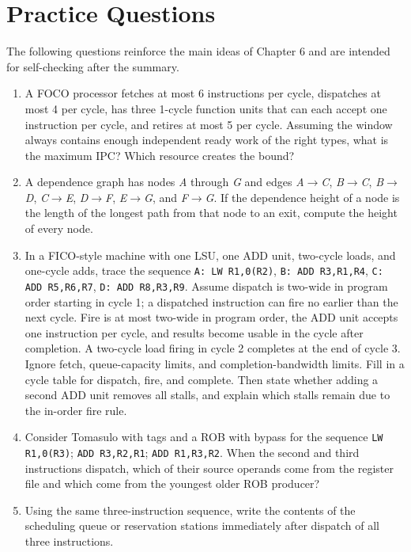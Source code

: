 \section{Practice Questions}\label{sec:ch6-practice}
The following questions reinforce the main ideas of Chapter 6 and are intended for self-checking after the summary.
\begin{enumerate}
    \item A FOCO processor fetches at most 6 instructions per cycle, dispatches at most 4 per cycle, has three 1-cycle function units that can each accept one instruction per cycle, and retires at most 5 per cycle.
    Assuming the window always contains enough independent ready work of the right types, what is the maximum IPC? Which resource creates the bound?
    \item A dependence graph has nodes \textit{A} through \textit{G} and edges \textit{A}$\rightarrow$\textit{C}, \textit{B}$\rightarrow$\textit{C}, \textit{B}$\rightarrow$\textit{D}, \textit{C}$\rightarrow$\textit{E}, \textit{D}$\rightarrow$\textit{F}, \textit{E}$\rightarrow$\textit{G}, and \textit{F}$\rightarrow$\textit{G}.
    If the dependence height of a node is the length of the longest path from that node to an exit, compute the height of every node.
    \item In a FICO-style machine with one LSU, one ADD unit, two-cycle loads, and one-cycle adds, trace the sequence \texttt{A: LW R1,0(R2)}, \texttt{B: ADD R3,R1,R4}, \texttt{C: ADD R5,R6,R7}, \texttt{D: ADD R8,R3,R9}.
    Assume dispatch is two-wide in program order starting in cycle 1; a dispatched instruction can fire no earlier than the next cycle.
    Fire is at most two-wide in program order, the ADD unit accepts one instruction per cycle, and results become usable in the cycle after completion.
    A two-cycle load firing in cycle 2 completes at the end of cycle 3.
    Ignore fetch, queue-capacity limits, and completion-bandwidth limits.
    Fill in a cycle table for dispatch, fire, and complete.
    Then state whether adding a second ADD unit removes all stalls, and explain which stalls remain due to the in-order fire rule.
    \item Consider Tomasulo with tags and a ROB with bypass for the sequence \texttt{LW R1,0(R3)}; \texttt{ADD R3,R2,R1}; \texttt{ADD R1,R3,R2}.
    When the second and third instructions dispatch, which of their source operands come from the register file and which come from the youngest older ROB producer?
    \item Using the same three-instruction sequence, write the contents of the scheduling queue or reservation stations immediately after dispatch of all three instructions.

\end{enumerate}
